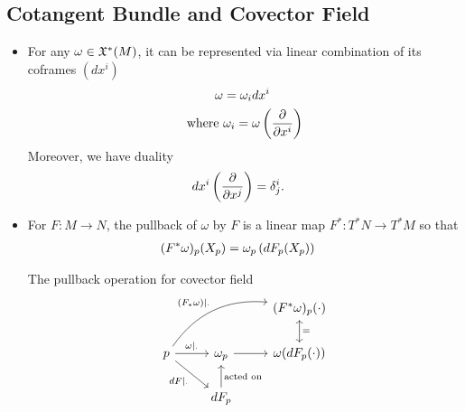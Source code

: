 \documentclass[11pt]{article}
\begin{document}
\subsection{Cotangent Bundle and Covector Field}
\begin{itemize}
\item For any $\omega \in {\mathfrak X}^{*}(M)$, it can be represented via linear combination of its coframes $(dx^i)$
 \begin{align*}
\omega &= \omega_i dx^i \\
\text{where }& \omega_i = \omega\left(\frac{\partial }{ \partial x^i}\right)
\end{align*}
Moreover, we have duality 
\begin{align*}
dx^{i}\left(\frac{\partial }{ \partial x^j}\right) &= \delta_{j}^{i}.
\end{align*}

\item For $F: M\rightarrow N$, the pullback of $\omega$ by $F$ is a linear map $F^{*}: T^{*}N \rightarrow T^{*}M$ so that 
\begin{align*}
(F^{*}\omega)_p(X_p) &= \omega_p\left(dF_p(X_p)\right)
\end{align*}
\begin{remark}
The pullback operation for covector field
\[
  \begin{tikzcd}
                     &  &(F^{*}\omega)_{p}(\cdot)  \arrow[d, leftrightarrow, "="]\\
         p  \arrow[swap]{dr}{dF|_{\cdot}} \arrow[urr, bend left, "(F_{*}\omega)|_{\cdot}"] \arrow[r, "\omega|_{\cdot}"]            &  \omega_p \arrow{r}{}  &  \omega(dF_p(\cdot))\\
      & dF_p  \arrow[swap]{u}{\text{acted on}}&  
  \end{tikzcd}
\] 
\end{remark}
\end{itemize}
\end{document}
